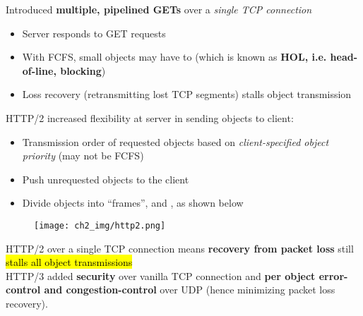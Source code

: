 \documentclass[12pt,a4paper]{article}
\begin{document}
\vspace{1.0em}


\noindent Introduced \textbf{multiple, pipelined GETs} over a \textit{single TCP connection} \\

\begin{itemize}
  \item Server responds  to GET requests
  \item With FCFS, small objects may have to  (which is known as \textbf{HOL, i.e. head-of-line, blocking})
  \item Loss recovery (retransmitting lost TCP segments) stalls object transmission
\end{itemize}


\noindent HTTP/2 increased flexibility at server in sending objects to client: \\
\begin{itemize}
  \item Transmission order of requested objects based on \textit{client-specified object priority} (may not be FCFS)
  \item Push unrequested objects to the client
  \item Divide objects into ``frames'', and , as shown below
\end{itemize}

\vspace{-1.0em}\begin{figure}[h]
  \centering
  \texttt{[image: ch2\_img/http2.png]}
\end{figure}


\noindent HTTP/2 over a single TCP connection means \textbf{recovery from packet loss} still \hl{stalls all object transmissions} \\

\noindent HTTP/3 added \textbf{security} over vanilla TCP connection and \textbf{per object error-control and congestion-control} over UDP (hence minimizing packet loss recovery).

\vspace{1.0em}
\end{document}
